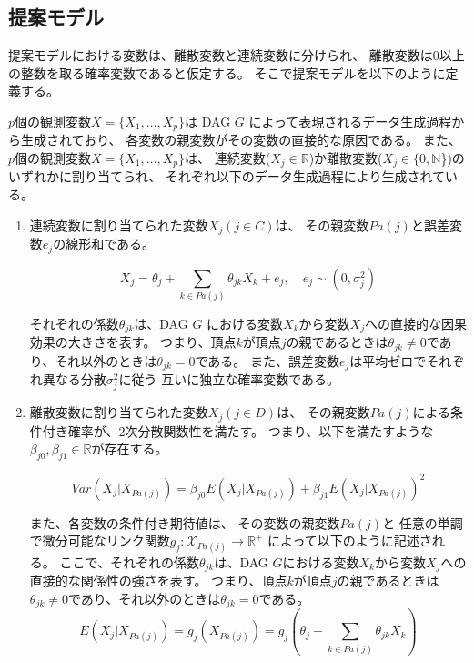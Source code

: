 
\subsection{提案モデル}

提案モデルにおける変数は、離散変数と連続変数に分けられ、
離散変数は0以上の整数を取る確率変数であると仮定する。
そこで提案モデルを以下のように定義する。

\begin{df}[提案モデル] \label{prop_model}
  $p$個の観測変数$X = \{ X_1, \dots, X_p \}$は
  DAG $G$ によって表現されるデータ生成過程から生成されており、
  各変数の親変数がその変数の直接的な原因である。
  また、$p$個の観測変数$X = \{ X_1, \dots, X_p \}$は、
  連続変数($X_j \in \mathbb R$)か離散変数($X_j \in \{0, \mathbb N$\})の
  いずれかに割り当てられ、
  それぞれ以下のデータ生成過程により生成されている。

  \begin{enumerate}
    \setlength{\itemsep}{0.3cm}
    \item
    連続変数に割り当てられた変数$X_j (j \in C)$は、
    その親変数$Pa(j)$と誤差変数$e_j$の線形和である。

    \begin{equation}
      X_j = \theta_{j} + \sum_{k \in Pa(j)} \theta_{jk}X_k + e_j,
      \quad e_j \sim (0, \sigma_j^2)
      \label{eq:anm_prop}
    \end{equation}

    それぞれの係数$\theta_{jk}$は、DAG $G$ における変数$X_k$から変数$X_j$への直接的な因果効果の大きさを表す。
    つまり、頂点$k$が頂点$j$の親であるときは$\theta_{jk} \neq 0$であり、それ以外のときは$\theta_{jk} = 0$である。
    また、誤差変数$e_j$は平均ゼロでそれぞれ異なる分散$\sigma_j^2$に従う
    互いに独立な確率変数である。

    \item
    離散変数に割り当てられた変数$X_j (j \in D)$は、
    その親変数$Pa(j)$による条件付き確率が、2次分散関数性を満たす。
    つまり、以下を満たすような$\beta_{j0},\beta_{j1} \in \mathbb{R}$が存在する。

    \begin{equation}
      \mathit{Var}(X_j|X_{Pa(j)}) = \beta_{j0} E(X_j | X_{Pa(j)}) + \beta_{j1} E(X_j | X_{Pa(j)})^2
      \label{QVF_prop}
    \end{equation}

    また、各変数の条件付き期待値は、
    その変数の親変数$Pa(j)$と
    任意の単調で微分可能なリンク関数$g_j \colon \mathcal X_{Pa(j)} \rightarrow \mathbb R^+$
    によって以下のように記述される。
    ここで、それぞれの係数$\theta_{jk}$は、DAG $G$における変数$X_k$から変数$X_j$への直接的な関係性の強さを表す。
    つまり、頂点$k$が頂点$j$の親であるときは$\theta_{jk} \neq 0$であり、それ以外のときは$\theta_{jk} = 0$である。
    \begin{equation}
      E(X_j | X_{Pa(j)})
      = g_j(X_{Pa(j)})
      = g_j \left(\theta_j + \sum_{k \in Pa(j)} \theta_{jk}X_k \right)
    \end{equation}

  \end{enumerate}
\end{df}

